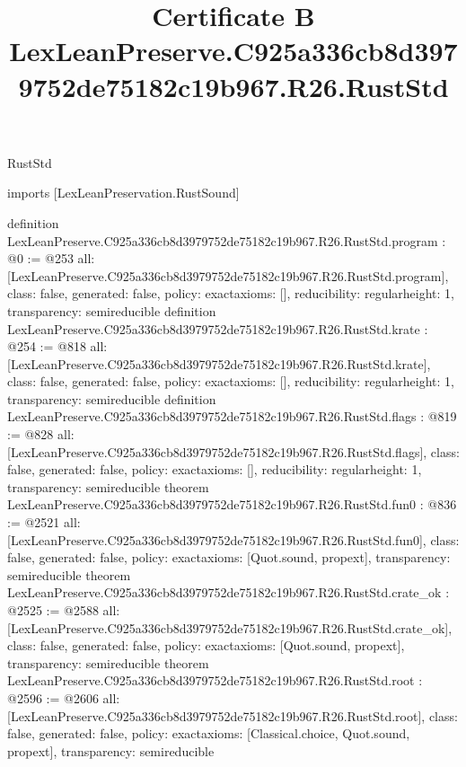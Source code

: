 \begin{lexlean}{RustStd}
\title{Certificate B LexLeanPreserve.C925a336cb8d3979752de75182c19b967.R26.RustStd}
\begin{coremodule}
imports [LexLeanPreservation.RustSound]

definition LexLeanPreserve.C925a336cb8d3979752de75182c19b967.R26.RustStd.program : @0 := @253 {
  all: [LexLeanPreserve.C925a336cb8d3979752de75182c19b967.R26.RustStd.program],
  class: false,
  generated: false,
  policy: exact{axioms: []},
  reducibility: regular{height: 1},
  transparency: semireducible
}
definition LexLeanPreserve.C925a336cb8d3979752de75182c19b967.R26.RustStd.krate : @254 := @818 {
  all: [LexLeanPreserve.C925a336cb8d3979752de75182c19b967.R26.RustStd.krate],
  class: false,
  generated: false,
  policy: exact{axioms: []},
  reducibility: regular{height: 1},
  transparency: semireducible
}
definition LexLeanPreserve.C925a336cb8d3979752de75182c19b967.R26.RustStd.flags : @819 := @828 {
  all: [LexLeanPreserve.C925a336cb8d3979752de75182c19b967.R26.RustStd.flags],
  class: false,
  generated: false,
  policy: exact{axioms: []},
  reducibility: regular{height: 1},
  transparency: semireducible
}
theorem LexLeanPreserve.C925a336cb8d3979752de75182c19b967.R26.RustStd.fun0 : @836 := @2521 {
  all: [LexLeanPreserve.C925a336cb8d3979752de75182c19b967.R26.RustStd.fun0],
  class: false,
  generated: false,
  policy: exact{axioms: [Quot.sound, propext]},
  transparency: semireducible
}
theorem LexLeanPreserve.C925a336cb8d3979752de75182c19b967.R26.RustStd.crate_ok : @2525 := @2588 {
  all: [LexLeanPreserve.C925a336cb8d3979752de75182c19b967.R26.RustStd.crate_ok],
  class: false,
  generated: false,
  policy: exact{axioms: [Quot.sound, propext]},
  transparency: semireducible
}
theorem LexLeanPreserve.C925a336cb8d3979752de75182c19b967.R26.RustStd.root : @2596 := @2606 {
  all: [LexLeanPreserve.C925a336cb8d3979752de75182c19b967.R26.RustStd.root],
  class: false,
  generated: false,
  policy: exact{axioms: [Classical.choice, Quot.sound, propext]},
  transparency: semireducible
}


\end{coremodule}
\end{lexlean}
